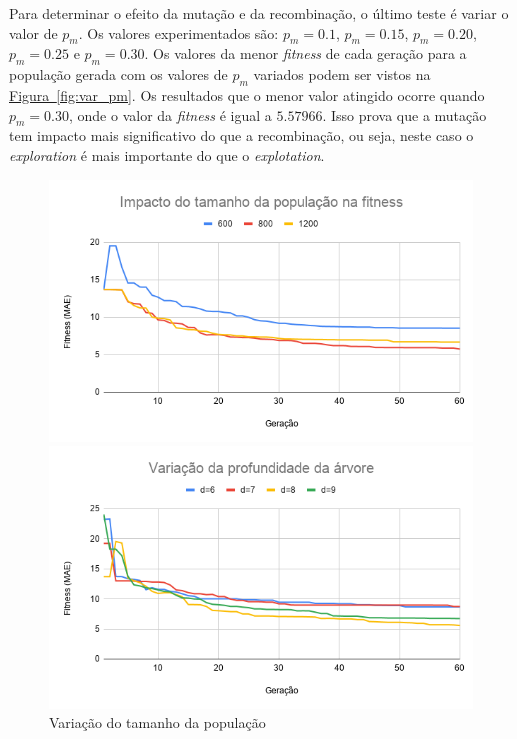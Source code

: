 \documentclass[a4paper]{paper}
\begin{document}
Para determinar o efeito da mutação e da recombinação, o último teste é variar o
valor de $p_m$. Os valores experimentados são: $p_m=0.1$, $p_m=0.15$,
$p_m=0.20$, $p_m=0.25$ e $p_m=0.30$. Os valores da menor \textit{fitness} de
cada geração para a população gerada com os valores de $p_m$ variados podem ser
vistos na \hyperref[fig:var_pm]{Figura~\ref*{fig:var_pm}}. Os resultados que o
menor valor atingido ocorre quando $p_m=0.30$, onde o valor da \textit{fitness}
é igual a $5.57966$. Isso prova que a mutação tem impacto mais significativo do
que a recombinação, ou seja, neste caso o \textit{exploration} é mais importante
do que o \textit{explotation}.

\begin{figure}[h!]
  \begin{minipage}{0.5\textwidth}
    \includegraphics[width=\textwidth]{var_pop}
    \caption{Variação do tamanho da população}
    \label{fig:var_pop}
  \end{minipage}
  \begin{minipage}{0.5\textwidth}
    \includegraphics[width=\textwidth]{var_d}

\end{minipage}
\end{figure}
\end{document}
